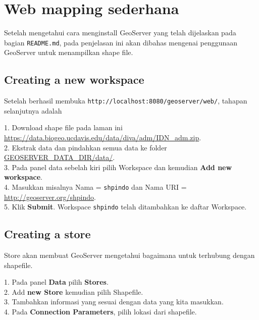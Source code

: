 \documentclass[12pt]{report}
\begin{document}

\newpage

\chapter*{Web mapping sederhana}
Setelah mengetahui cara menginstall GeoServer yang telah dijelaskan pada bagian \texttt{README.md}, pada penjelasan ini akan dibahas mengenai penggunaan GeoServer untuk menampilkan shape file.   

\section*{Creating a new workspace}
Setelah berhasil membuka \texttt{http://localhost:8080/geoserver/web/}, tahapan selanjutnya adalah \newline

1. Download shape file pada laman ini \url{https://data.biogeo.ucdavis.edu/data/diva/adm/IDN_adm.zip}. \\

2. Ekstrak data dan pindahkan semua data ke folder \url{GEOSERVER_DATA_DIR/data/}. \\

3. Pada panel data sebelah kiri pilih Workspace dan kemudian \textbf{Add new workspace}. \\

4. Masukkan misalnya Nama = \texttt{shpindo}  dan Nama URI = \url{http://geoserver.org/shpindo}. \\

5. Klik \textbf{Submit}. Workspace \texttt{shpindo} telah ditambahkan ke daftar Workspace. \\

\section*{Creating a store}
Store akan membuat GeoServer mengetahui bagaimana untuk terhubung dengan shapefile.\newline 

1. Pada panel \textbf{Data} pilih \textbf{Stores}.\\

2. Add \textbf{new Store} kemudian pilih Shapefile.\\

3. Tambahkan informasi yang sesuai dengan data yang kita masukkan.\\

4. Pada \textbf{Connection Parameters}, pilih lokasi dari shapefile.\\
\end{document}
